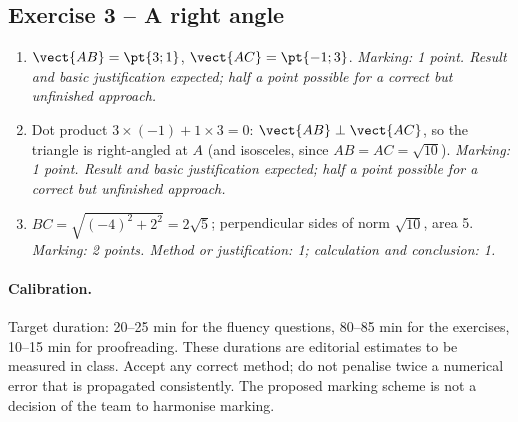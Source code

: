 \subsection*{Exercise 3 -- A right angle}
\begin{enumerate}
\item $\vect{AB}=\pt{3;1}$, $\vect{AC}=\pt{-1;3}$. \textit{Marking: 1 point. Result and basic justification expected; half a point possible for a correct but unfinished approach.}
\item Dot product $3\times(-1)+1\times3=0$: $\vect{AB}\perp\vect{AC}$, so the triangle is right-angled at $A$ (and isosceles, since $AB=AC=\sqrt{10}$). \textit{Marking: 1 point. Result and basic justification expected; half a point possible for a correct but unfinished approach.}
\item $BC=\sqrt{(-4)^2+2^2}=2\sqrt5$; perpendicular sides of norm $\sqrt{10}$, area 5. \textit{Marking: 2 points. Method or justification: 1; calculation and conclusion: 1.}
\end{enumerate}
\paragraph{Calibration.} Target duration: 20--25 min for the fluency questions, 80--85 min for the exercises, 10--15 min for proofreading. These durations are editorial estimates to be measured in class. Accept any correct method; do not penalise twice a numerical error that is propagated consistently. The proposed marking scheme is not a decision of the team to harmonise marking.
